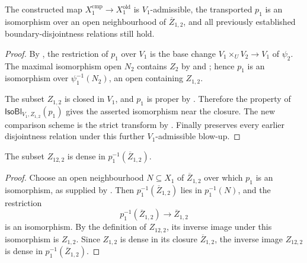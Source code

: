 \begin{lemma}
  \label{lemma:nagata-comparison-isIso-near-boundary}

  The constructed map $X_1^{\mathrm{cmp}}\to X_1^{\mathrm{old}}$ is
  $V_1$-admissible, the transported $p_1$ is an isomorphism over an open
  neighbourhood of $\overline Z_{1,2}$, and all previously established
  boundary-disjointness relations still hold.
\end{lemma}

\begin{proof}
  By , the restriction of
  $p_1$ over $V_1$ is the base change
  $V_1\times_UV_2\to V_1$ of $\psi_2$.  The maximal isomorphism open $N_2$
  contains $Z_2$ by  and
  ; hence $p_1$ is an
  isomorphism over $\psi_1^{-1}(N_2)$, an open containing $Z_{1,2}$.

  The subset $Z_{1,2}$ is closed in $V_1$, and $p_1$ is proper by
  .  Therefore the property
  of $\mathsf{IsoBl}_{V_1,Z_{1,2}}(p_1)$ gives the asserted isomorphism near
  the closure.  The new comparison scheme is the strict transform by
  .  Finally
   preserves every earlier
  disjointness relation under this further $V_1$-admissible blow-up.
\end{proof}


\begin{lemma}
  \label{lemma:nagata-comparison-boundary-density}

  The subset $Z_{12,2}$ is dense in
  $p_1^{-1}(\overline Z_{1,2})$.
\end{lemma}

\begin{proof}
  Choose an open neighbourhood $N\subseteq X_1$ of
  $\overline Z_{1,2}$ over which $p_1$ is an isomorphism, as supplied by
  .  Then
  $p_1^{-1}(\overline Z_{1,2})$ lies in $p_1^{-1}(N)$, and the restriction
  \[
    p_1^{-1}(\overline Z_{1,2})\longrightarrow\overline Z_{1,2}
  \]
  is an isomorphism.  By the definition of $Z_{12,2}$, its inverse image under
  this isomorphism is $Z_{1,2}$.  Since $Z_{1,2}$ is dense in its closure
  $\overline Z_{1,2}$, the inverse image $Z_{12,2}$ is dense in
  $p_1^{-1}(\overline Z_{1,2})$.
\end{proof}


